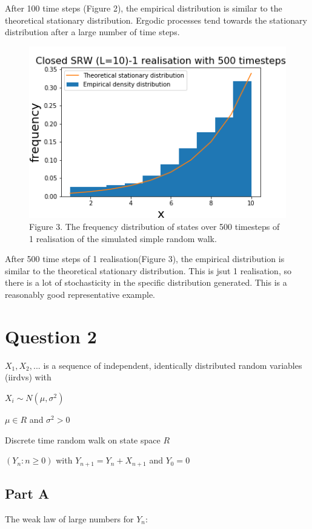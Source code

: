 \documentclass{article}
\begin{document}
After 100 time steps (Figure 2), the empirical distribution is similar to the theoretical stationary distribution. Ergodic processes tend towards the stationary distribution after a large number of time steps.


\begin{figure}[H]
\includegraphics[scale=1]{500_steps_a.png} 
\small{Figure 3. The frequency distribution of states over 500 timesteps of 1 realisation of the simulated simple random walk.}
\end{figure}

After 500 time steps of 1 realisation(Figure 3), the empirical distribution is similar to the theoretical stationary distribution. This is jsut 1 realisation, so there is a lot of stochasticity in the specific distribution generated. This is a reasonably good representative example.



\section{Question 2}

$X_1, X_2, ... $ is a sequence of independent, identically distributed random variables (iirdvs) with 

$X_i \sim N(\mu, \sigma^2)$ 

$\mu \in {R}$ and $\sigma^2 > 0$

Discrete time random walk on state space ${R}$

$(Y_n : n \geq 0)$ with $Y_{n+1} = Y_n + X_{n+1}$ and $Y_0 = 0$


\subsection{Part A}

The weak law of large numbers for $Y_n$:
\end{document}
